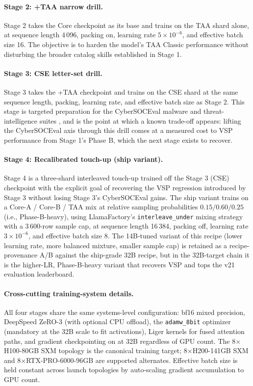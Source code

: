 \documentclass[webpdf,contemporary,large]{oup-authoring-template}
\theoremstyle{thmstyleone}
\theoremstyle{thmstyletwo}
\theoremstyle{thmstylethree}
\begin{document}
\paragraph{Stage 2: +TAA narrow drill.}
Stage 2 takes the Core checkpoint as its base and trains on the TAA shard alone, at sequence length 4\,096, packing on, learning rate $5 \times 10^{-6}$, and effective batch size 16. The objective is to harden the model's TAA Classic performance without disturbing the broader catalog skills established in Stage 1.

\paragraph{Stage 3: CSE letter-set drill.}
Stage 3 takes the +TAA checkpoint and trains on the CSE shard at the same sequence length, packing, learning rate, and effective batch size as Stage 2. This stage is targeted preparation for the CyberSOCEval malware and threat-intelligence suites \cite{cybersoceval2025}, and is the point at which a known trade-off appears: lifting the CyberSOCEval axis through this drill comes at a measured cost to VSP performance from Stage 1's Phase B, which the next stage exists to recover.

\paragraph{Stage 4: Recalibrated touch-up (ship variant).}
Stage 4 is a three-shard interleaved touch-up trained off the Stage 3 (CSE) checkpoint with the explicit goal of recovering the VSP regression introduced by Stage 3 without losing Stage 3's CyberSOCEval gains. The ship variant trains on a Core-A / Core-B / TAA mix at relative sampling probabilities $0.15 / 0.60 / 0.25$ (i.e., Phase-B-heavy), using LlamaFactory's \texttt{interleave\_under} mixing strategy with a 3\,600-row sample cap, at sequence length 16\,384, packing off, learning rate $3 \times 10^{-6}$, and effective batch size 8. The 14B-tuned variant of this recipe (lower learning rate, more balanced mixture, smaller sample cap) is retained as a recipe-provenance A/B against the ship-grade 32B recipe, but in the 32B-target chain it is the higher-LR, Phase-B-heavy variant that recovers VSP and tops the v21 evaluation leaderboard.

\paragraph{Cross-cutting training-system details.}
All four stages share the same systems-level configuration: bf16 mixed precision, DeepSpeed ZeRO-3 (with optional CPU offload), the \texttt{adamw\_8bit} optimizer (mandatory at the 32B scale to fit activations), Liger kernels for fused attention paths, and gradient checkpointing on at 32B regardless of GPU count. The 8$\times$H100-80GB SXM topology is the canonical training target; 8$\times$H200-141GB SXM and 8$\times$RTX-PRO-6000-96GB are supported alternates. Effective batch size is held constant across launch topologies by auto-scaling gradient accumulation to GPU count.
\end{document}
